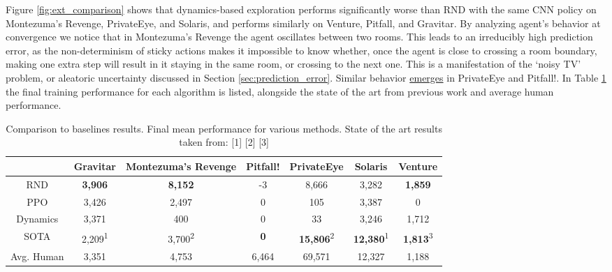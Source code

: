 \documentclass{article} \usepackage[dvipsnames]{xcolor}
\begin{document}
Figure \ref{fig:ext_comparison} shows that dynamics-based exploration performs significantly worse than RND with the same CNN policy on Montezuma's Revenge, PrivateEye, and Solaris, and performs similarly on Venture, Pitfall, and Gravitar. By analyzing agent's behavior at convergence we notice that in Montezuma's Revenge the agent oscillates between two rooms. This leads to an irreducibly high prediction error, as the non-determinism of sticky actions makes it impossible to know whether, once the agent is close to crossing a room boundary, making one extra step will result in it staying in the same room, or crossing to the next one. This is a manifestation of the `noisy TV' problem, or aleatoric uncertainty discussed in Section \ref{sec:prediction_error}. Similar behavior \href{https://github.com/openai/random-network-distillation}{emerges} in PrivateEye and Pitfall!. In Table \ref{table:baselines} the final training performance for each algorithm is listed, alongside the state of the art from previous work and average human performance.
\begin{table}[ht]
\centering
\tabcolsep=0.11cm
\begin{tabular}{c | c  c  c  c  c  c} 
            & Gravitar          & Montezuma's Revenge & Pitfall! & PrivateEye           & Solaris & Venture   \\ [0.5ex] 
 \hline
 RND    & \textbf{3,906}    &  \textbf{8,152}               &  -3      &  8,666               &  3,282    &   \textbf{1,859}   \\ 
 PPO    & 3,426              & 2,497                &  0       &  105                 &  3,387     &  0          \\
 Dynamics    & 3,371              & 400                &  0       &  33                 &  3,246     &  1,712          \\
 SOTA       & 2,209\textsuperscript{1}&3,700\textsuperscript{2}&\textbf{0}&\textbf{15,806}\textsuperscript{2}&\textbf{12,380}\textsuperscript{1}& \textbf{1,813}\textsuperscript{3}\\ \hline
 Avg. Human & 3,351          &  4,753              & 6,464    &69,571                & 12,327    &  1,188   \\ [1ex] 
\end{tabular}
\caption{Comparison to baselines results. Final mean performance for various methods. State of the art results taken from: [1] \citep{fortunato2017noisy} [2] \citep{bellemare2016unifying} [3] \citep{horgan2018distributed}}
\label{table:baselines}
\end{table}
\end{document}
